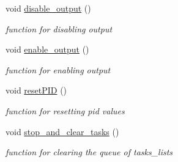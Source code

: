 \begin{DoxyCompactItemize}
void \hyperlink{classControl_a2a6668b67b265687badf674e56416bef}{disable\+\_\+output} ()
\begin{DoxyCompactList}\small\item\em function for disabling output \end{DoxyCompactList}\item 
void \hyperlink{classControl_ad2fd9593f94a996e015097d781a440c3}{enable\+\_\+output} ()
\begin{DoxyCompactList}\small\item\em function for enabling output \end{DoxyCompactList}\item 
void \hyperlink{classControl_acbefd0ff411f2ac506880cb77dcb7c50}{reset\+P\+ID} ()
\begin{DoxyCompactList}\small\item\em function for resetting pid values \end{DoxyCompactList}\item 
void \hyperlink{classControl_affda1a8c2f9cebb0ceef8c9970258dd2}{stop\+\_\+and\+\_\+clear\+\_\+tasks} ()
\begin{DoxyCompactList}\small\item\em function for clearing the queue of tasks\+\_\+lists \end{DoxyCompactList}\end{DoxyCompactItemize}
